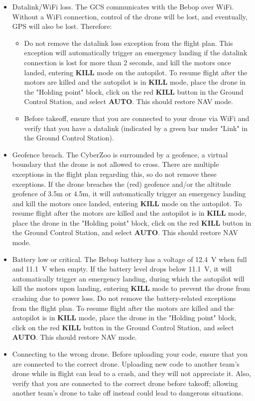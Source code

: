 \begin{itemize}
\begin{itemize}
		\item Datalink/WiFi loss. The GCS communicates with the Bebop over WiFi. Without a WiFi connection, control of the drone will be lost, and eventually, GPS will also be lost. Therefore:
		\begin{itemize}
			\item Do not remove the datalink loss exception from the flight plan. This exception will automatically trigger an emergency landing if the datalink connection is lost for more than 2 seconds, and kill the motors once landed, entering \textbf{KILL} mode on the autopilot. To resume flight after the motors are killed and the autopilot is in \textbf{KILL} mode, place the drone in the "Holding point" block, click on the red \textbf{KILL} button in the Ground Control Station, and select \textbf{AUTO}. This should restore NAV mode.
			\item Before takeoff, ensure that you are connected to your drone via WiFi and verify that you have a datalink (indicated by a green bar under "Link" in the Ground Control Station).
		\end{itemize}
		\item Geofence breach. The CyberZoo is surrounded by a geofence, a virtual boundary that the drone is not allowed to cross. There are multiple exceptions in the flight plan regarding this, so do not remove these exceptions. If the drone breaches the (red) geofence and/or the altitude geofence of 3.5m or 4.5m, it will automatically trigger an emergency landing and kill the motors once landed, entering \textbf{KILL} mode on the autopilot. To resume flight after the motors are killed and the autopilot is in \textbf{KILL} mode, place the drone in the "Holding point" block, click on the red \textbf{KILL} button in the Ground Control Station, and select \textbf{AUTO}. This should restore NAV mode.
		\item Battery low or critical. The Bebop battery has a voltage of 12.4~V when full and 11.1~V when empty. If the battery level drops below 11.1~V, it will automatically trigger an emergency landing, during which the autopilot will kill the motors upon landing, entering \textbf{KILL} mode to prevent the drone from crashing due to power loss. Do not remove the battery-related exceptions from the flight plan. To resume flight after the motors are killed and the autopilot is in \textbf{KILL} mode, place the drone in the "Holding point" block, click on the red \textbf{KILL} button in the Ground Control Station, and select \textbf{AUTO}. This should restore NAV mode.
		\item Connecting to the wrong drone. Before uploading your code, ensure that you are connected to the correct drone. Uploading new code to another team's drone while in flight can lead to a crash, and they will not appreciate it. Also, verify that you are connected to the correct drone before takeoff; allowing another team's drone to take off instead could lead to dangerous situations.

\end{itemize}
\end{itemize}
